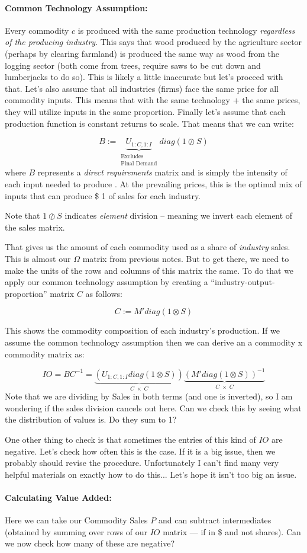 \documentclass[12pt,english]{article}
\begin{document}
\paragraph{Common Technology Assumption:} Every commodity $c$ is produced with the same production technology \emph{regardless of the producing industry}. This says that wood produced by the agriculture sector (perhaps by clearing farmland) is produced the same way as wood from the logging sector (both come from trees, require saws to be cut down and lumberjacks to do so). This is likely a little inaccurate but let's proceed with that. Let's also assume that all industries (firms) face the same price for all commodity inputs. This means that with the same technology + the same prices, they will utilize inputs in the same proportion. Finally let's assume that each production function is constant returns to scale. That means that we can write:

$$
	B:= \underbrace{U_{1:C,1:I}}_{\substack{\text{Excludes}\\\text{Final Demand}}}diag(1\oslash S)
$$
where $B$ represents a \emph{direct requirements} matrix and is simply the intensity of each input needed to produce . At the prevailing prices, this is the optimal mix of inputs that can produce \$ 1 of sales for each industry.

Note that $1\oslash S$ indicates \emph{element} division -- meaning we invert each element of the sales matrix. 

That gives us the amount of each commodity used as a share of \emph{industry} sales. This is almost our $\Omega$ matrix from previous notes. But to get there, we need to make the units of the rows and columns of this matrix the same. To do that we apply our common technology assumption by creating a ``industry-output-proportion'' matrix $C$ as follows:

$$
	C:= M'diag(1\otimes S)
$$

This shows the commodity composition of each industry's production. If we assume the common technology assumption then we can derive an a commodity x commodity matrix as:

$$
	IO = BC^{-1} = \underbrace{(U_{1:C,1:I} diag(1\otimes S))}_{C\;\times\; C}\underbrace{(M'diag(1\otimes S))^{-1}}_{C\;\times\; C}
$$
Note that we are dividing by Sales in both terms (and one is inverted), so I am wondering if the sales division cancels out here. Can we check this by seeing what the distribution of values is. Do they sum to 1?

One other thing to check is that sometimes the entries of this kind of $IO$ are negative. Let's check how often this is the case. If it is a big issue, then we probably should revise the procedure. Unfortunately I can't find many very helpful materials on exactly how to do this... Let's hope it isn't too big an issue.

\paragraph{Calculating Value Added:} Here we can take our Commodity Sales $P$ and can subtract intermediates (obtained by summing over rows of our $IO$ matrix --- if in \$ and not shares). Can we now check how many of these are negative?
\end{document}
